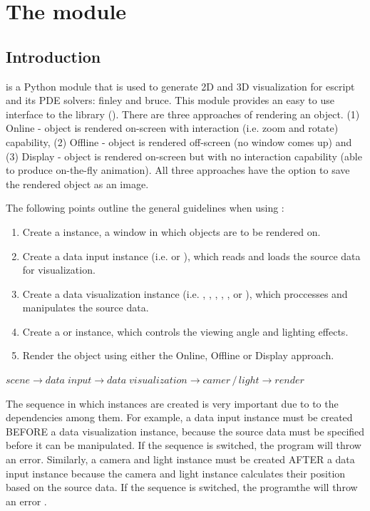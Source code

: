 \chapter{The module \pyvisi}
\label{PYVISI CHAP}

\section{Introduction}
\pyvisi is a Python module that is used to generate 2D and 3D visualization 
for escript and its PDE solvers: finley and bruce. This module provides 
an easy to use interface to the \VTK library (\VTKUrl). There are three 
approaches of rendering an object. (1) Online - object is rendered on-screen 
with interaction (i.e. zoom and rotate) capability, (2) Offline - object is 
rendered off-screen (no window comes up) and (3) Display - object is rendered 
on-screen but with no interaction capability (able to produce on-the-fly 
animation). All three approaches have the option to save the rendered object 
as an image.

The following points outline the general guidelines when using \pyvisi:

\begin{enumerate}
\item Create a \Scene instance, a window in which objects are to be rendered on.
\item Create a data input instance (i.e. \DataCollector or \ImageReader), which 
reads and loads the source data for visualization.
\item Create a data visualization instance (i.e. \Map, \Velocity, \Ellipsoid, 
\Contour, \Carpet, \StreamLine or \Image), which proccesses and manipulates the 
source data.
\item Create a \Camera or \Light instance, which controls the viewing angle and
lighting effects.
\item Render the object using either the Online, Offline or Display approach.
\end{enumerate}
\begin{center}
\begin{math}
scene \rightarrow data \; input \rightarrow data \; visualization \rightarrow 
camer \, / \, light \rightarrow render
\end{math}
\end{center}

The sequence in which instances are created is very important due to
to the dependencies among them. For example, a data input instance must 
be created BEFORE a data visualization instance, because the source data must 
be specified before it can be manipulated. If the sequence is switched, 
the program will throw an error. Similarly, a camera and light instance must 
be created AFTER a data input instance because the camera and light instance 
calculates their position based on the source data. If the sequence is switched,
the programthe will throw an error . 


